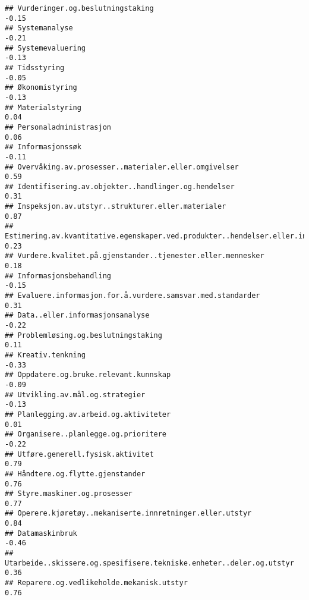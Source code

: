 \documentclass[
]{article}
\begin{document}
\begin{verbatim}
## Vurderinger.og.beslutningstaking                                                 -0.15
## Systemanalyse                                                                    -0.21
## Systemevaluering                                                                 -0.13
## Tidsstyring                                                                      -0.05
## Økonomistyring                                                                   -0.13
## Materialstyring                                                                   0.04
## Personaladministrasjon                                                            0.06
## Informasjonssøk                                                                  -0.11
## Overvåking.av.prosesser..materialer.eller.omgivelser                              0.59
## Identifisering.av.objekter..handlinger.og.hendelser                               0.31
## Inspeksjon.av.utstyr..strukturer.eller.materialer                                 0.87
## Estimering.av.kvantitative.egenskaper.ved.produkter..hendelser.eller.informasjon  0.23
## Vurdere.kvalitet.på.gjenstander..tjenester.eller.mennesker                        0.18
## Informasjonsbehandling                                                           -0.15
## Evaluere.informasjon.for.å.vurdere.samsvar.med.standarder                         0.31
## Data..eller.informasjonsanalyse                                                  -0.22
## Problemløsing.og.beslutningstaking                                                0.11
## Kreativ.tenkning                                                                 -0.33
## Oppdatere.og.bruke.relevant.kunnskap                                             -0.09
## Utvikling.av.mål.og.strategier                                                   -0.13
## Planlegging.av.arbeid.og.aktiviteter                                              0.01
## Organisere..planlegge.og.prioritere                                              -0.22
## Utføre.generell.fysisk.aktivitet                                                  0.79
## Håndtere.og.flytte.gjenstander                                                    0.76
## Styre.maskiner.og.prosesser                                                       0.77
## Operere.kjøretøy..mekaniserte.innretninger.eller.utstyr                           0.84
## Datamaskinbruk                                                                   -0.46
## Utarbeide..skissere.og.spesifisere.tekniske.enheter..deler.og.utstyr              0.36
## Reparere.og.vedlikeholde.mekanisk.utstyr                                          0.76

\end{verbatim}
\end{document}
